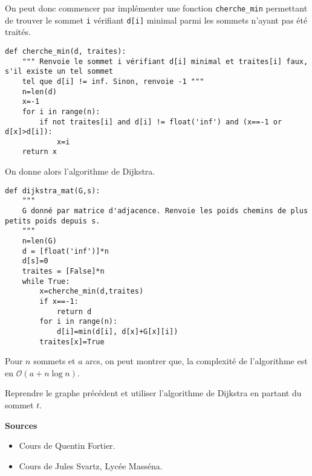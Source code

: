 On peut donc commencer par implémenter une fonction \texttt{cherche\_min} permettant de trouver le sommet \texttt{i} vérifiant \texttt{d[i]} minimal
parmi les sommets n'ayant pas été traités.%


\begin{lstlisting}
def cherche_min(d, traites):
    """ Renvoie le sommet i vérifiant d[i] minimal et traites[i] faux, s'il existe un tel sommet
    tel que d[i] != inf. Sinon, renvoie -1 """
    n=len(d)
    x=-1
    for i in range(n):
        if not traites[i] and d[i] != float('inf') and (x==-1 or d[x]>d[i]):
            x=i
    return x
\end{lstlisting}


On donne alors l'algorithme de Dijkstra.

\begin{lstlisting}
def dijkstra_mat(G,s):
    """ 
    G donné par matrice d'adjacence. Renvoie les poids chemins de plus petits poids depuis s. 
    """
    n=len(G)
    d = [float('inf')]*n
    d[s]=0
    traites = [False]*n
    while True:
        x=cherche_min(d,traites)
        if x==-1:
            return d
        for i in range(n):
            d[i]=min(d[i], d[x]+G[x][i])
        traites[x]=True
\end{lstlisting}

\begin{prop}
Pour $n$ sommets et $a$ arcs, on peut montrer que, la complexité de l'algorithme est en $\mathcal{O}\left(a+n\log n\right)$.
\end{prop}

\begin{exemple}
Reprendre le graphe précédent et utiliser l'algorithme de Dijkstra en partant du sommet $t$.
\end{exemple}

\vfill
\textbf{Sources}
\begin{itemize}
\item Cours de Quentin Fortier.
\item Cours de Jules Svartz, Lycée Masséna.
\end{itemize}
